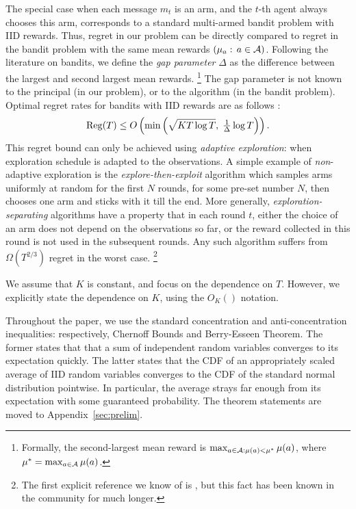 The special case when each message $m_t$ is an arm, and the $t$-th agent always chooses this arm, corresponds to a standard multi-armed bandit problem with IID rewards. Thus, regret in our problem can be directly compared to regret in the bandit problem with the same mean rewards $(\mu_a:\,a\in\mathcal{A})$. Following the literature on bandits, we define the \emph{gap parameter} $\Delta$ as the difference between the largest and second largest mean rewards.%
\footnote{Formally, the second-largest mean reward is
    $\max_{a\in\mathcal{A}:\mu(a)<\mu^*} \mu(a)$,
where $\mu^* = \max_{a\in\mathcal{A}} \mu(a)$.
}
The gap parameter is not known to the principal (in our problem), or to the algorithm (in the bandit problem). Optimal regret rates for bandits with IID rewards are as follows \cite{bandits-ucb1,bandits-exp3,Lai-Robbins-85}:
\begin{align}\label{eq:model-OptRegret}
\mathrm{Reg}(T) \leq O\left(\min\left(
    \sqrt{KT\log T},\; \tfrac{1}{\Delta} \log T
    \right)\right).
\end{align}
This regret bound can only be achieved using \emph{adaptive exploration}: \ie when exploration schedule is adapted to the observations. A simple example of \emph{non}-adaptive exploration is the \emph{explore-then-exploit} algorithm which samples arms uniformly at random for the first $N$ rounds, for some pre-set number $N$, then chooses one arm and sticks with it till the end. More generally,
\emph{exploration-separating} algorithms have a property that in each round $t$, either the choice of an arm does not depend on the observations so far, or the reward collected in this round is not used in the subsequent rounds. Any such algorithm suffers from $\Omega(T^{2/3})$ regret in the worst case.%
\footnote{The first explicit reference we know of is \cite{MechMAB-ec09,DevanurK09}, but this fact has been known in the community for much longer.}

We assume that $K$ is constant, and focus on the dependence on $T$. However, we explicitly state the dependence on $K$, \eg using the $O_K()$ notation.

Throughout the paper, we use the standard concentration and anti-concentration inequalities: respectively, Chernoff Bounds and Berry-Esseen Theorem. The former states that that a sum of independent random variables converges to its expectation quickly. The latter states that the CDF of an appropriately scaled average of IID random variables converges to the CDF of the standard normal distribution pointwise. In particular, the average strays far enough from its expectation with some guaranteed probability. The theorem statements are moved to Appendix~\ref{sec:prelim}.

